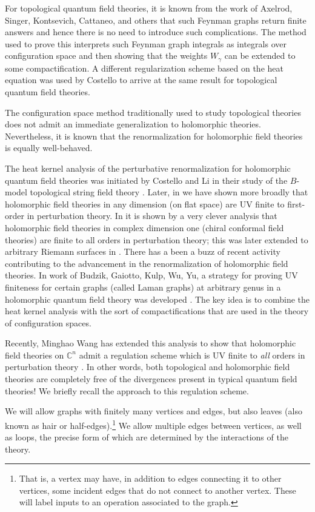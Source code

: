 \documentclass[11pt]{amsart}
\def\C{{\mathbb{C}}}
\begin{document}
For topological quantum field theories, it is known from the work of Axelrod, Singer, Kontsevich, Cattaneo, and others \cite{???} that such Feynman graphs return finite answers and hence there is no need to introduce such complications.
The method used to prove this interprets such Feynman graph integrals as integrals over configuration space and then showing that the weights $W_\gamma$ can be extended to some compactification.
A different regularization scheme based on the heat equation was used by Costello \cite{CosRenormPaper} to arrive at the same result for topological quantum field theories.

The configuration space method traditionally used to study topological theories does not admit an immediate generalization to holomorphic theories.
Nevertheless, it is known that the renormalization for holomorphic field theories is equally well-behaved.

The heat kernel analysis of the perturbative renormalization for holomorphic quantum field theories was initiated by Costello and Li in their study of the $B$-model topological string field theory \cite{??}.
Later, in \cite{Whol} we have shown more broadly that holomorphic field theories in any dimension (on flat space) are UV finite to first-order in perturbation theory.
In \cite{LiVertex} it is shown by a very clever analysis that holomorphic field theories in complex dimension one (chiral conformal field theories) are finite to all orders in perturbation theory; this was later extended to arbitrary Riemann surfaces in \cite{Jie and Si}.
There has a been a buzz of recent activity contributing to the advancement in the renormalization of holomorphic field theories.
In work of Budzik, Gaiotto, Kulp, Wu, Yu, a strategy for proving UV finiteness for certain graphs (called Laman graphs) at arbitrary genus in a holomorphic quantum field theory was developed \cite{BGKWY}.
The key idea is to combine the heat kernel analysis with the sort of compactifications that are used in the theory of configuration spaces.

Recently, Minghao Wang has extended this analysis to show that holomorphic field theories on $\C^n$ admit a regulation scheme which is UV finite to \textit{all} orders in perturbation theory \cite{Wang}.
In other words, both topological and holomorphic field theories are completely free of the divergences present in typical quantum field theories!
We briefly recall the approach to this regulation scheme.

We will allow graphs with finitely many vertices and edges, 
but also leaves (also known as hair or half-edges).\footnote{That is, a vertex may have, in addition to edges connecting it to other vertices, some incident edges that do not connect to another vertex. 
These will label inputs to an operation associated to the graph.}
We allow multiple edges between vertices, as well as loops, the precise form of which are determined by the interactions of the theory.
\end{document}
